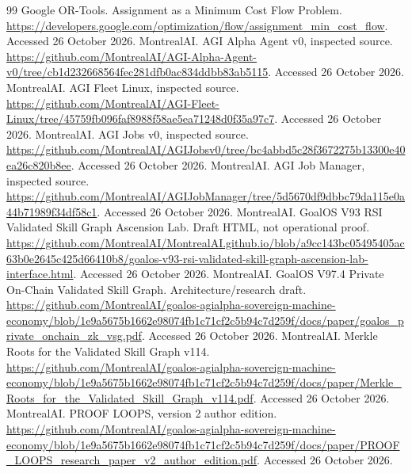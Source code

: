 \begin{thebibliography}{99}
 Google OR-Tools. Assignment as a Minimum Cost Flow Problem. \url{https://developers.google.com/optimization/flow/assignment_min_cost_flow}. Accessed 26 October 2026.
 MontrealAI. AGI Alpha Agent v0, inspected source. \url{https://github.com/MontrealAI/AGI-Alpha-Agent-v0/tree/cb1d232668564fec281dfb0ac834ddbb83ab5115}. Accessed 26 October 2026.
 MontrealAI. AGI Fleet Linux, inspected source. \url{https://github.com/MontrealAI/AGI-Fleet-Linux/tree/45759fb096faf8988f58ae5ea71248d0f35a97c7}. Accessed 26 October 2026.
 MontrealAI. AGI Jobs v0, inspected source. \url{https://github.com/MontrealAI/AGIJobsv0/tree/bc4abbd5c28f3672275b13300e40ea26c820b8ee}. Accessed 26 October 2026.
 MontrealAI. AGI Job Manager, inspected source. \url{https://github.com/MontrealAI/AGIJobManager/tree/5d5670df9dbbc79da115e0a44b71989f34df58c1}. Accessed 26 October 2026.
 MontrealAI. GoalOS V93 RSI Validated Skill Graph Ascension Lab. Draft HTML, not operational proof. \url{https://github.com/MontrealAI/MontrealAI.github.io/blob/a9cc143bc05495405ac63b0e2645c425d66410b8/goalos-v93-rsi-validated-skill-graph-ascension-lab-interface.html}. Accessed 26 October 2026.
 MontrealAI. GoalOS V97.4 Private On-Chain Validated Skill Graph. Architecture/research draft. \url{https://github.com/MontrealAI/goalos-agialpha-sovereign-machine-economy/blob/1e9a5675b1662e98074fb1c71cf2c5b94c7d259f/docs/paper/goalos_private_onchain_zk_vsg.pdf}. Accessed 26 October 2026.
 MontrealAI. Merkle Roots for the Validated Skill Graph v114. \url{https://github.com/MontrealAI/goalos-agialpha-sovereign-machine-economy/blob/1e9a5675b1662e98074fb1c71cf2c5b94c7d259f/docs/paper/Merkle_Roots_for_the_Validated_Skill_Graph_v114.pdf}. Accessed 26 October 2026.
 MontrealAI. PROOF LOOPS, version 2 author edition. \url{https://github.com/MontrealAI/goalos-agialpha-sovereign-machine-economy/blob/1e9a5675b1662e98074fb1c71cf2c5b94c7d259f/docs/paper/PROOF_LOOPS_research_paper_v2_author_edition.pdf}. Accessed 26 October 2026.
\end{thebibliography}

